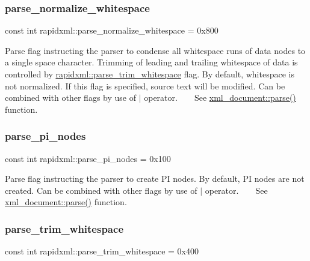 \subsubsection{\texorpdfstring{parse\+\_\+normalize\+\_\+whitespace}{parse\_normalize\_whitespace}}
{\footnotesize\ttfamily const int rapidxml\+::parse\+\_\+normalize\+\_\+whitespace = 0x800}

Parse flag instructing the parser to condense all whitespace runs of data nodes to a single space character. Trimming of leading and trailing whitespace of data is controlled by \mbox{\hyperlink{namespacerapidxml_a61912424b47db5038e726d4e1c22417f}{rapidxml\+::parse\+\_\+trim\+\_\+whitespace}} flag. By default, whitespace is not normalized. If this flag is specified, source text will be modified. Can be combined with other flags by use of $\vert$ operator. ~\newline
~\newline
 See \mbox{\hyperlink{classrapidxml_1_1xml__document_ac6e73ff9ac323bf5a370c38feb03a6b1}{xml\+\_\+document\+::parse()}} function. \mbox{\label{namespacerapidxml_a03fe68fcf5d28f38476e0fd31adecc4c}} 
\subsubsection{\texorpdfstring{parse\+\_\+pi\+\_\+nodes}{parse\_pi\_nodes}}
{\footnotesize\ttfamily const int rapidxml\+::parse\+\_\+pi\+\_\+nodes = 0x100}

Parse flag instructing the parser to create PI nodes. By default, PI nodes are not created. Can be combined with other flags by use of $\vert$ operator. ~\newline
~\newline
 See \mbox{\hyperlink{classrapidxml_1_1xml__document_ac6e73ff9ac323bf5a370c38feb03a6b1}{xml\+\_\+document\+::parse()}} function. \mbox{\label{namespacerapidxml_a61912424b47db5038e726d4e1c22417f}} 
\subsubsection{\texorpdfstring{parse\+\_\+trim\+\_\+whitespace}{parse\_trim\_whitespace}}
{\footnotesize\ttfamily const int rapidxml\+::parse\+\_\+trim\+\_\+whitespace = 0x400}

